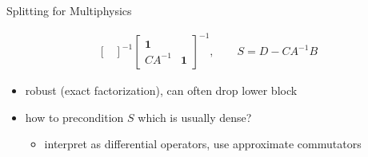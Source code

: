 \begin{frame}{Splitting for Multiphysics}
\begin{itemize}
\begin{align*}
\begin{bmatrix}
      \end{bmatrix}^{-1}
      \begin{bmatrix}
        \mathbf{1} & \\ CA^{-1} & \mathbf{1}
      \end{bmatrix}^{-1}, \qquad
      S = D - C A^{-1} B
    \end{align*}
    \begin{itemize}
    \item robust (exact factorization), can often drop lower block
    \item how to precondition $S$ which is usually dense?
      \begin{itemize}
      \item interpret as differential operators, use approximate commutators
      \end{itemize}
    \end{itemize}
  \end{itemize}
\end{frame}
